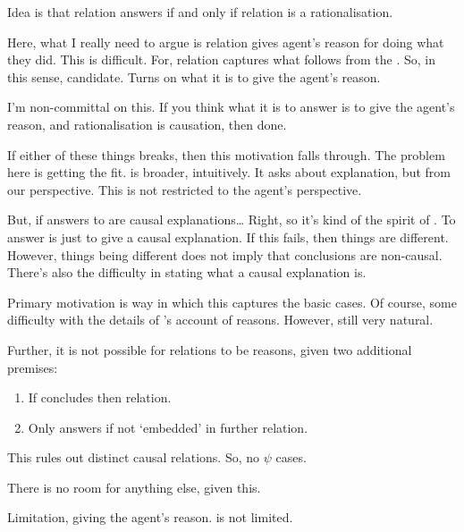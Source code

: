 \begin{note}
  \color{red}
  Idea is that relation answers \qWhy{} if and only if relation is a rationalisation.

  Here, what I really need to argue is relation gives agent's reason for doing what they did.
  This is difficult.
  For, relation captures what follows from the \agpe{}.
  So, in this sense, candidate.
  Turns on what it is to give the agent's reason.

  I'm non-committal on this.
  If you think what it is to answer \qWhy{} is to give the agent's reason, and rationalisation is causation, then done.

  If either of these things breaks, then this motivation falls through.
  The problem here is getting the fit.
  \qWhy{} is broader, intuitively.
  It asks about explanation, but from our perspective.
  This is not restricted to the agent's perspective.

  But, if answers to \qWhy{} are causal explanations\dots
  {
    \color{red}
    Right, so it's kind of the spirit of \citeauthor{Davidson:1963aa}.
    To answer \qWhy{} is just to give a causal explanation.
    If this fails, then things are different.
    However, things being different does not imply that conclusions are non-causal.
    There's also the difficulty in stating what a causal explanation is.
  }

  Primary motivation is way in which this captures the basic cases.
  Of course, some difficulty with the details of \citeauthor{Davidson:1963aa}'s account of reasons.
  However, still very natural.

  Further, it is not possible for relations to be reasons, given two additional premises:
  \begin{enumerate}
  \item
    If concludes then relation.
  \item
    Only answers \qWhy{} if not `embedded' in further relation.
  \end{enumerate}

  This rules out distinct causal relations.
  So, no \(\psi\) cases.

  There is no room for anything else, given this.

  Limitation, giving the agent's reason.
  \qWhy{} is not limited.
\end{note}


